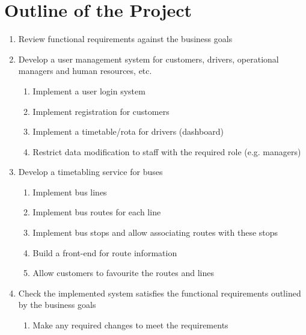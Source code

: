 \section{Outline of the Project}

\begin{enumerate}
  \item Review functional requirements against the business goals
  \item Develop a user management system for customers, drivers,
  operational managers and human resources, etc.
  \begin{enumerate}
    \item Implement a user login system
    \item Implement registration for customers
    \item Implement a timetable/rota for drivers (dashboard)
    \item Restrict data modification to staff with the required role
    (e.g. managers)
  \end{enumerate}
  \item Develop a timetabling service for buses
  \begin{enumerate}
    \item Implement bus lines
    \item Implement bus routes for each line
    \item Implement bus stops and allow associating routes with
    these stops
    \item Build a front-end for route information
    \item Allow customers to favourite the routes and lines
  \end{enumerate}
  \item Check the implemented system satisfies the functional
  requirements outlined by the business goals
  \begin{enumerate}
    \item Make any required changes to meet the requirements
  \end{enumerate}
\end{enumerate}
